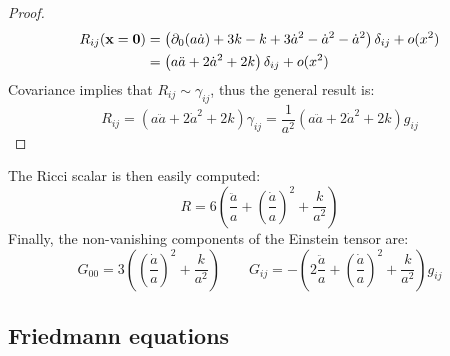 \begin{proof}
  \begin{equation*}
    \begin{split}
      R_{ij} (\mathbf{x} = \mathbf{0})
      &= \left( \partial_0 (a\dot{a}) + 3k - k + 3 \dot{a}^2 - \dot{a}^2 - \dot{a}^2 \right) \delta_{ij} + o(x^2) \\
      &= \left( a\ddot{a} + 2 \dot{a}^2 + 2k \right) \delta_{ij} + o(x^2)
    \end{split}
  \end{equation*}
  Covariance implies that $ R_{ij} \sim \gamma_{ij} $, thus the general result is:
  \begin{equation*}
    R_{ij} = \left( a\ddot{a} + 2\dot{a}^2 + 2k \right) \gamma_{ij} = \frac{1}{a^2} \left( a\ddot{a} + 2\dot{a}^2 + 2k \right) g_{ij}
  \end{equation*}
\end{proof}

The Ricci scalar is then easily computed:
\begin{equation}
  R = 6 \left( \frac{\ddot{a}}{a} + \left( \frac{\dot{a}}{a} \right)^2 + \frac{k}{a^2} \right)
  \label{eq:4.59}
\end{equation}
Finally, the non-vanishing components of the Einstein tensor are:
\begin{equation}
  G_{00} = 3 \left( \left( \frac{\dot{a}}{a} \right)^2 + \frac{k}{a^2} \right)
  \qquad
  G_{ij} = - \left( 2 \frac{\ddot{a}}{a} + \left( \frac{\dot{a}}{a} \right)^2 + \frac{k}{a^2} \right) g_{ij}
  \label{eq:4.60}
\end{equation}

\subsection{Friedmann equations}

